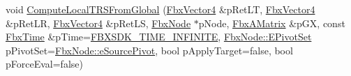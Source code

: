 \begin{DoxyCompactItemize}
void \hyperlink{class_fbx_anim_evaluator_a7ffe74bd370dfef23e5c1dd88b334e3d}{Compute\+Local\+T\+R\+S\+From\+Global} (\hyperlink{class_fbx_vector4}{Fbx\+Vector4} \&p\+Ret\+LT, \hyperlink{class_fbx_vector4}{Fbx\+Vector4} \&p\+Ret\+LR, \hyperlink{class_fbx_vector4}{Fbx\+Vector4} \&p\+Ret\+LS, \hyperlink{class_fbx_node}{Fbx\+Node} $\ast$p\+Node, \hyperlink{class_fbx_a_matrix}{Fbx\+A\+Matrix} \&p\+GX, const \hyperlink{class_fbx_time}{Fbx\+Time} \&p\+Time=\hyperlink{fbxtime_8h_a1e6db3fe0f84f0b7daa775739f93526f}{F\+B\+X\+S\+D\+K\+\_\+\+T\+I\+M\+E\+\_\+\+I\+N\+F\+I\+N\+I\+TE}, \hyperlink{class_fbx_node_ae62b7311ac4727654cdf1ebd5cbf7343}{Fbx\+Node\+::\+E\+Pivot\+Set} p\+Pivot\+Set=\hyperlink{class_fbx_node_ae62b7311ac4727654cdf1ebd5cbf7343ae8ed37a5c7e41f8d1cec9d3fa8424b69}{Fbx\+Node\+::e\+Source\+Pivot}, bool p\+Apply\+Target=false, bool p\+Force\+Eval=false)
\end{DoxyCompactItemize}
